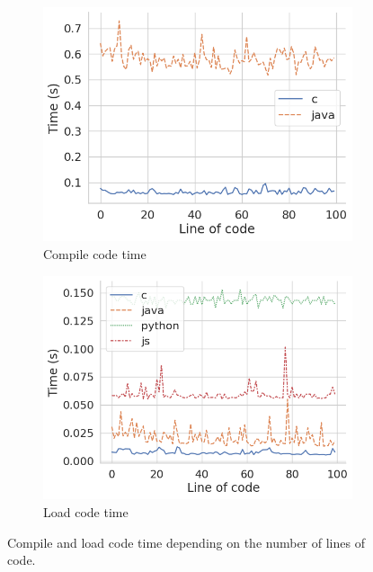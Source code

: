 \documentclass[english,submission]{programming}
\begin{document}
\begin{figure}[htbp]
  \centering
  \begin{subfigure}[b]{0.48\textwidth}
      \centering
      \includegraphics[width=\textwidth]{img/compile_code.png}
      \caption{\centering Compile code time}
      \label{subfig:compile}
  \end{subfigure}
  \hfill
  \begin{subfigure}[b]{0.48\textwidth}
      \centering
      \includegraphics[width=\textwidth]{img/load_code.png}
      \caption{\centering Load code time}
      \label{subfig:load}
  \end{subfigure}
  \caption{Compile and load code time depending on the number of lines of code.}
  \label{fig:compileload}
\end{figure}
\end{document}
